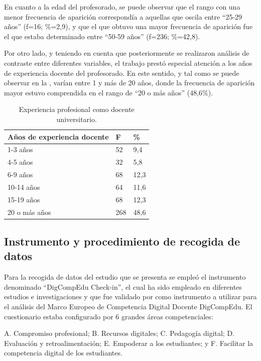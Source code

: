 \documentclass[spanish]{textolivre}
\begin{document}
En cuanto a la edad del profesorado, se puede observar que el rango con una menor frecuencia de aparición correspondía a aquellas que oscila entre “25-29 años” (f=16; \%=2,9), y que el que obtuvo una mayor frecuencia de aparición fue el que estaba determinado entre “50-59 años” (f=236; \%=42,8).

Por otro lado, y teniendo en cuenta que posteriormente se realizaron análisis de contraste entre diferentes variables, el trabajo prestó especial atención a los años de experiencia docente del profesorado. En este sentido, y tal como se puede observar en la , varían entre 1 y más de 20 años, donde la frecuencia de aparición mayor estuvo comprendida en el rango de “20 o más años” (48,6\%).

\begin{table}[htpb]
\caption{Experiencia profesional como docente universitario.}
\label{tab1}
\centering
\begin{tabular}{lll}
\toprule
Años de experiencia docente & F & \%
\\ 
\midrule
1-3 años & 52 & 9,4
\\
4-5 años & 32 & 5,8
\\
6-9 años & 68 & 12,3
\\
10-14 años & 64 & 11,6
\\
15-19 años & 68 & 12,3
\\
20 o más años & 268 & 48,6
\\ 
\bottomrule
\end{tabular}
\end{table}

\subsection{Instrumento y procedimiento de recogida de datos}
Para la recogida de datos del estudio que se presenta se empleó el instrumento denominado “DigCompEdu Check-in”, el cual ha sido empleado en diferentes estudios e investigaciones \cite{cabero-almenara2020, romero-tena2020} y que fue validado por \textcite{ghomi2019} como instrumento a utilizar para el análisis del Marco Europeo de Competencia Digital Docente DigCompEdu. El cuestionario estaba configurado por 6 grandes áreas competenciales: 

A. Compromiso profesional; B. Recursos digitales; C. Pedagogía digital; D. Evaluación y retroalimentación; E. Empoderar a los estudiantes; y F. Facilitar la competencia digital de los estudiantes. 
\end{document}
